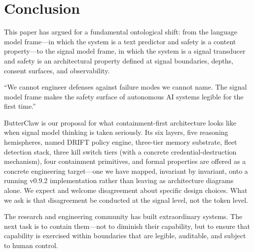 \documentclass[11pt,a4paper]{article}
\begin{document}
\section{Conclusion}
\label{sec:conclusion}

This paper has argued for a fundamental ontological shift: from the language model frame---in
which the system is a text predictor and safety is a content property---to the signal model
frame, in which the system is a signal transducer and safety is an architectural property defined
at signal boundaries, depths, consent surfaces, and observability.

\begin{pullquotebox}
``We cannot engineer defenses against failure modes we cannot name. The signal model frame makes
the safety surface of autonomous AI systems legible for the first time.''
\end{pullquotebox}

ButterClaw is our proposal for what containment-first architecture looks like when signal model
thinking is taken seriously. Its six layers, five reasoning hemispheres, named DRIFT policy
engine, three-tier memory substrate, fleet detection stack, three kill switch tiers (with a
concrete credential-destruction mechanism), four containment primitives, and formal properties are
offered as a concrete engineering target---one we have mapped, invariant by invariant, onto a
running v0.9.2 implementation rather than leaving as architecture diagrams alone. We expect and
welcome disagreement about specific design choices. What we ask is that disagreement be conducted
at the signal level, not the token level.

The research and engineering community has built extraordinary systems. The next task is to
contain them---not to diminish their capability, but to ensure that capability is exercised
within boundaries that are legible, auditable, and subject to human control.
\end{document}
